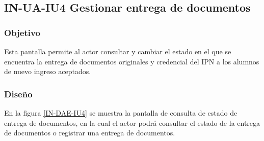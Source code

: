\subsection{IN-UA-IU4 Gestionar entrega de documentos}

\subsubsection{Objetivo}
	
	Esta pantalla permite al actor consultar y cambiar el estado en el que se encuentra la entrega de documentos originales y credencial del IPN a los alumnos de  nuevo ingreso aceptados.

\subsubsection{Diseño}

    En la figura \ref{IN-DAE-IU4} se muestra la pantalla de consulta de estado de entrega de documentos, en la cual el actor podrá consultar el estado de la entrega de documentos o registrar una entrega de documentos.
            

